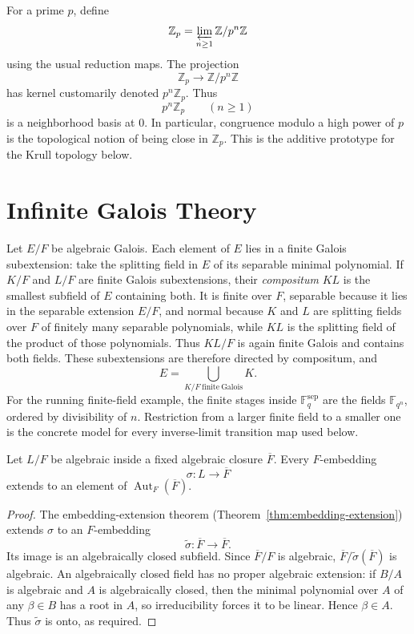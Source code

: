 \begin{example}
For a prime \(p\), define
\[
\mathbb Z_p=\varprojlim_{n\geq1}\mathbb Z/p^n\mathbb Z
\]
using the usual reduction maps.  The projection
\[
\mathbb Z_p\longrightarrow\mathbb Z/p^n\mathbb Z
\]
has kernel customarily denoted \(p^n\mathbb Z_p\).  Thus
\[
p^n\mathbb Z_p\qquad(n\geq1)
\]
is a neighborhood basis at \(0\).  In particular, congruence modulo a high
power of \(p\) is the topological notion of being close in \(\mathbb Z_p\).
This is the additive prototype for the Krull topology below.
\end{example}

\section{Infinite Galois Theory}

Let \(E/F\) be algebraic Galois.  Each element of \(E\) lies in a finite
Galois subextension: take the splitting field in \(E\) of its separable
minimal polynomial.  If \(K/F\) and \(L/F\) are finite Galois subextensions,
their \emph{compositum} \(KL\) is the smallest subfield of \(E\) containing
both.  It is finite over \(F\), separable because it lies in the separable
extension \(E/F\), and normal because \(K\) and \(L\) are splitting fields
over \(F\) of finitely many separable polynomials, while \(KL\) is the
splitting field of the product of those polynomials.  Thus \(KL/F\) is again
finite Galois and contains both fields.  These subextensions are therefore
directed by compositum, and
\[
E=\bigcup_{K/F\ \mathrm{finite\ Galois}}K.
\]
For the running finite-field example, the finite stages inside
\(\mathbb F_q^{\mathrm{sep}}\) are the fields \(\mathbb F_{q^n}\), ordered
by divisibility of \(n\).  Restriction from a larger finite field to a smaller
one is the concrete model for every inverse-limit transition map used below.

\begin{lemma}\label{lem:closure-auto-extension}
Let \(L/F\) be algebraic inside a fixed algebraic closure \(\overline F\).
Every \(F\)-embedding
\[
\sigma:L\longrightarrow\overline F
\]
extends to an element of \(\operatorname{Aut}_F(\overline F)\).
\end{lemma}
\begin{proof}
The embedding-extension theorem (Theorem~\ref{thm:embedding-extension}) extends \(\sigma\) to an \(F\)-embedding
\[
\widetilde\sigma:\overline F\longrightarrow\overline F.
\]
Its image is an algebraically closed subfield.  Since \(\overline F/F\) is
algebraic, \(\overline F/\widetilde\sigma(\overline F)\) is algebraic.  An
algebraically closed field has no proper algebraic extension: if \(B/A\) is
algebraic and \(A\) is algebraically closed, then the minimal polynomial over
\(A\) of any \(\beta\in B\) has a root in \(A\), so irreducibility forces it
to be linear.  Hence \(\beta\in A\).  Thus
\(\widetilde\sigma\) is onto, as required.
\end{proof}

